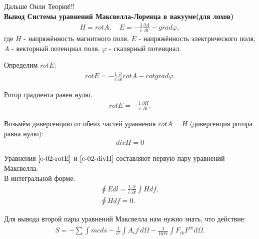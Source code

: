\documentclass[__main__.tex]{subfiles}
\begin{document}
Дальше Онли Теория!!!\\

\textbf{Вывод Системы уравнений Максвелла-Лоренца в вакууме(для лохов)}\\

\begin{gather*}
	H = rot A, \quad E = -\frac{1}{c}\frac{\partial A}{\partial t} - grad \varphi,
\end{gather*}
где $H$ - напряжённость магнитного поля, $E$ - напряжённость электрического поля,
$A$ - векторный потенциал поля,
$\varphi$ - скалярный потенциал.

Определим $rot E$:
\begin{gather*}
	rot E = -\frac{1}{c}\frac{\partial}{\partial t}rot A - rot grad \varphi.
\end{gather*}

Ротор градиента равен нулю.
\begin{gather}
	\label{e-02-rotE}
	rot E = -\frac{1}{c}\frac{\partial H}{\partial t}.
\end{gather}

Возьмём дивергенцию от обеих частей уравнения $rot A = H$ (дивергенция ротора равна нулю):
\begin{gather}
	\label{e-02-divH}
	div H = 0
\end{gather}

Уравнения $\ref{e-02-rotE}$ и  $\ref{e-02-divH}$ составляют первую пару уравнений Максвелла.\\
В интегральной форме:\\
\begin{gather*}
	\oint Edl = \frac{1}{c}\frac{\partial}{\partial t}\int Hdf,\\
	\oint H df = 0.
\end{gather*}

Для вывода второй пары уравнений Максвелла нам нужно знать, что действие:
\begin{gather}
	\label{e-02-S}
	S = -\sum\int mcds - \frac{1}{c^2}\int A_ij^id\Omega - \frac{1}{16\pi c}\int F_{ik}F^{ik}d\Omega.
\end{gather}
\end{document}

